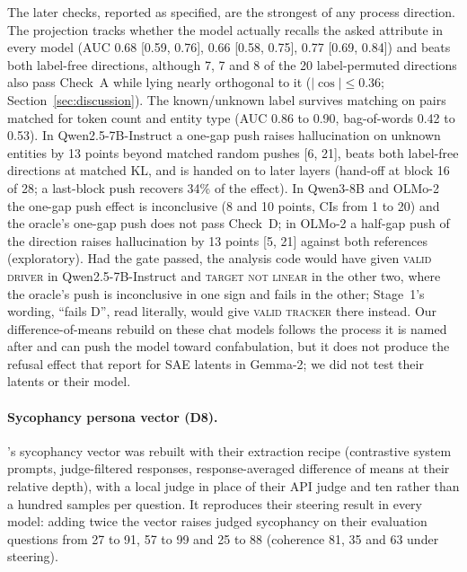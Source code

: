 \documentclass[11pt]{article}
\newcommand{\verdict}[1]{\textsc{\MakeLowercase{#1}}}
\begin{document}
The later checks, reported as specified, are the strongest of any process direction. The projection tracks whether the model actually recalls the asked attribute in every model (AUC 0.68 [0.59, 0.76], 0.66 [0.58, 0.75], 0.77 [0.69, 0.84]) and beats both label-free directions, although 7, 7 and 8 of the 20 label-permuted directions also pass Check~A while lying nearly orthogonal to it ($|\cos| \le 0.36$; Section~\ref{sec:discussion}). The known/unknown label survives matching on pairs matched for token count and entity type (AUC 0.86 to 0.90, bag-of-words 0.42 to 0.53). In Qwen2.5-7B-Instruct a one-gap push raises hallucination on unknown entities by 13 points beyond matched random pushes [6, 21], beats both label-free directions at matched KL, and is handed on to later layers (hand-off at block 16 of 28; a last-block push recovers 34\% of the effect). In Qwen3-8B and OLMo-2 the one-gap push effect is inconclusive (8 and 10 points, CIs from 1 to 20) and the oracle's one-gap push does not pass Check~D; in OLMo-2 a half-gap push of the direction raises hallucination by 13 points [5, 21] against both references (exploratory). Had the gate passed, the analysis code would have given \verdict{VALID DRIVER} in Qwen2.5-7B-Instruct and \verdict{TARGET NOT LINEAR} in the other two, where the oracle's push is inconclusive in one sign and fails in the other; Stage~1's wording, ``fails D'', read literally, would give \verdict{VALID TRACKER} there instead. Our difference-of-means rebuild on these chat models follows the process it is named after and can push the model toward confabulation, but it does not produce the refusal effect that \citet{ferrando2025entities} report for SAE latents in Gemma-2; we did not test their latents or their model.

\paragraph{Sycophancy persona vector (D8).} \citet{chen2025persona}'s sycophancy vector was rebuilt with their extraction recipe (contrastive system prompts, judge-filtered responses, response-averaged difference of means at their relative depth), with a local judge in place of their API judge and ten rather than a hundred samples per question. It reproduces their steering result in every model: adding twice the vector raises judged sycophancy on their evaluation questions from 27 to 91, 57 to 99 and 25 to 88 (coherence 81, 35 and 63 under steering).
\end{document}
